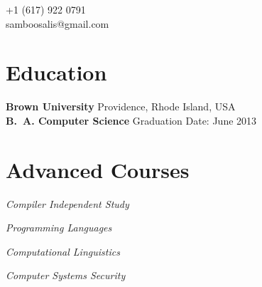 \documentclass[margin,line]{resume}
\begin{document}
\begin{resume}

    \hfill +1 (617) 922 0791         \vspace{0mm}\\\vspace{0mm}%
    \hfill samboosalis@gmail.com     \vspace{0mm}\\\vspace{-4.5mm}%

    \section{\mysidestyle{} Education}

    \textbf{Brown University} 			\hfill Providence, Rhode Island, USA 	   \vspace{2mm}\\
    \textbf{B.\ A. Computer Science}		\hfill Graduation Date: June 2013 \vspace{-3mm}\\\vspace{-1.5mm}%

    \section{\mysidestyle{} Advanced Courses}

    \textsl{Compiler Independent Study}			\par\vspace{-4mm}%
     {\addtolength{\leftskip}{2 mm} 
      \par}
 
     \textsl{Programming Languages}	\par\vspace{-4mm}%
    {\addtolength{\leftskip}{2 mm} 
    \par}
    
    \textsl{Computational Linguistics}	\par\vspace{-4mm}%
     {\addtolength{\leftskip}{2 mm} 
         \par}
					
    \textsl{Computer Systems Security}	\par\vspace{-4mm}%
    {\addtolength{\leftskip}{2 mm} 
    \par}
    

\end{resume}
\end{document}
